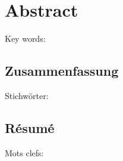 

\cleardoublepage
\chapter*{Abstract}
\vskip0.5cm
Key words: 


\begin{otherlanguage}{german}
\cleardoublepage
\chapter*{Zusammenfassung}
\vskip0.5cm
Stichwörter: 
\end{otherlanguage}




\begin{otherlanguage}{french}
\cleardoublepage
\chapter*{Résumé}
\vskip0.5cm
Mots clefs: 
\end{otherlanguage}


